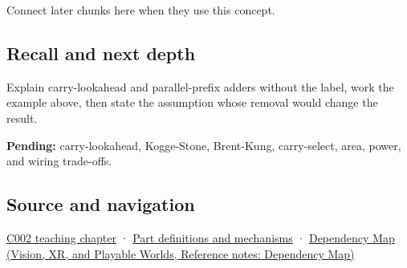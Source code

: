 Connect later chunks here when they use this concept.

\subsection{Recall and next depth}\label{appendix-b5c46b2d94ff-recall-and-next-depth}

Explain carry-lookahead and parallel-prefix adders without the label, work the example above, then state the assumption whose removal would change the result.

\textbf{Pending:} carry-lookahead, Kogge-Stone, Brent-Kung, carry-select, area, power, and wiring trade-offs.

\subsection{Source and navigation}\label{appendix-b5c46b2d94ff-source-and-navigation}

\hyperref[01-foundations-i-ch001-arithmetic-becomes-a-policy]{C002 teaching chapter} · \hyperref[appendix-fd090d982a15]{Part definitions and mechanisms} · \href{../07-Vision-XR-and-Playable-Worlds/main.pdf\#nameddest=appendix-4ad47bdd269a}{Dependency Map (Vision, XR, and Playable Worlds, Reference notes: Dependency Map)}

